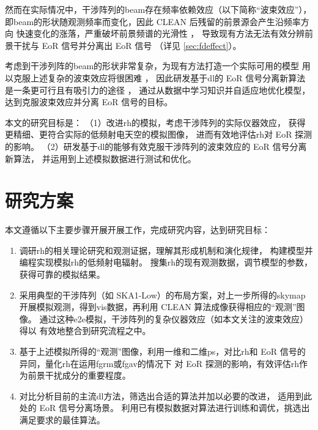 \begin{itemize}
\hspace{2\ccwd}%
然而在实际情况中，干涉阵列的\ac{beam}存在频率依赖效应（以下简称“波束效应”），
即\acl{beam}的形状随观测频率而变化，因此 CLEAN 后残留的前景源会产生沿频率方向
快速变化的涨落，严重破坏前景频谱的光滑性 \cite{liu2009ps}，
导致现有方法无法有效分辨前景干扰与 EoR 信号并分离出 EoR 信号
（详见 \autoref{sec:fdeffect}）。

\hspace{2\ccwd}%
考虑到干涉列阵的\acl{beam}的形状非常复杂，为现有方法打造一个实际可用的模型
用以克服上述复杂的波束效应将很困难 \cite{lochner2015}，
因此研发基于\ac{dl}的 EoR 信号分离新算法是一条更可行且有吸引力的途径
\cite{herbel2018,vafaeiSadr2018}，
通过从数据中学习知识并自适应地优化模型，达到克服波束效应并分离 EoR 信号的目标。

\end{itemize}

本文的研究目标是：
（1）改进\acl{rh}的模拟，考虑干涉阵列的实际仪器效应，
获得更精细、更符合实际的低频射电天空的模拟图像，
进而有效地评估\acl{rh}对 EoR 探测的影响。
（2）研发基于\acl{dl}的能够有效克服干涉阵列的波束效应的 EoR 信号分离新算法，
并运用到上述模拟数据进行测试和优化。


\section{研究方案}
\label{sec:plan}

本文遵循以下主要步骤开展开展工作，完成研究内容，达到研究目标：
\begin{enumerate}
\item
调研\acl{rh}的相关理论研究和观测证据，理解其形成机制和演化规律，
构建模型并编程实现模拟\acl{rh}的低频射电辐射。
搜集\acl{rh}的现有观测数据，调节模型的参数，获得可靠的模拟结果。

\item
采用典型的干涉阵列（如 SKA1-Low）的布局方案，对上一步所得的\ac{skymap}
开展模拟观测，得到\ac{vis}数据，再利用 CLEAN 算法成像获得相应的“观测”图像。
通过这种\ac{e2e}模拟，干涉阵列的复杂仪器效应（如本文关注的波束效应）得以
有效地整合到研究流程之中。

\item
基于上述模拟所得的“观测”图像，利用一维和二维\ac{ps}，对比\acl{rh}和
EoR 信号的异同，量化\acl{rh}在运用\acl{fgrm}或\acl{fgav}的情况下
对 EoR 探测的影响，有效评估\acl{rh}作为前景干扰成分的重要程度。

\item
对比分析目前的主流\acl{dl}方法，筛选出合适的算法并加以必要的改进，
适用到此处的 EoR 信号分离场景。
利用已有模拟数据对算法进行训练和调优，挑选出满足要求的最佳算法。

\end{enumerate}


